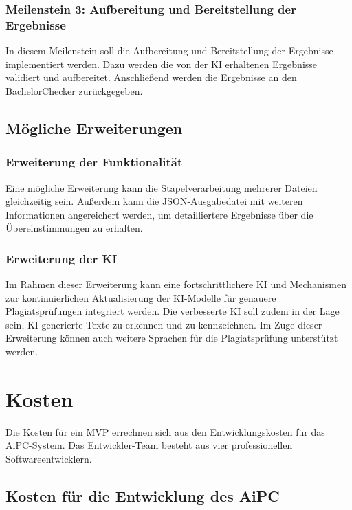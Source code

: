 \subsubsection{Meilenstein 3: Aufbereitung und Bereitstellung der Ergebnisse}
In diesem Meilenstein soll die Aufbereitung und Bereitstellung der Ergebnisse implementiert werden.
Dazu werden die von der \ac{KI} erhaltenen Ergebnisse validiert und aufbereitet.
Anschließend werden die Ergebnisse an den BachelorChecker zurückgegeben.

\subsection{Mögliche Erweiterungen}\label{subsec:moegliche-erweiterungen}

\subsubsection{Erweiterung der Funktionalität}\label{subsubsec:-erweiterung-der-funktionalitat}
Eine mögliche Erweiterung kann die Stapelverarbeitung mehrerer Dateien gleichzeitig sein.
Außerdem kann die \ac{JSON}-Ausgabedatei mit weiteren Informationen angereichert werden, um detailliertere Ergebnisse über die Übereinstimmungen zu erhalten.

\subsubsection{Erweiterung der KI}\label{subsubsec:-erweiterung-der-ki}
Im Rahmen dieser Erweiterung kann eine fortschrittlichere \ac{KI} und Mechanismen zur kontinuierlichen Aktualisierung der \ac{KI}-Modelle für genauere Plagiatsprüfungen integriert werden.
Die verbesserte \ac{KI} soll zudem in der Lage sein, \ac{KI} generierte Texte zu erkennen und zu kennzeichnen.
Im Zuge dieser Erweiterung können auch weitere Sprachen für die Plagiatsprüfung unterstützt werden.


\section{Kosten}\label{sec:kosten}

Die Kosten für ein \ac{MVP} errechnen sich aus den Entwicklungskosten für das \ac{AiPC}-System.
Das Entwickler-Team besteht aus vier professionellen Softwareentwicklern.

\subsection{Kosten für die Entwicklung des AiPC}\label{subsec:kosten-fuer-die-entwicklung-des-aipc}

